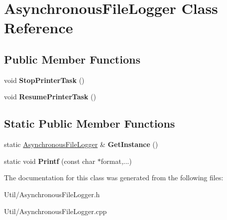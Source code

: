 \hypertarget{class_asynchronous_file_logger}{
\section{\-Asynchronous\-File\-Logger \-Class \-Reference}
\label{class_asynchronous_file_logger}
}
\subsection*{\-Public \-Member \-Functions}
\begin{DoxyCompactItemize}
\item 
\hypertarget{class_asynchronous_file_logger_a5702988e18a1192d3932f036c7f3932e}{
void {\bfseries \-Stop\-Printer\-Task} ()}
\label{class_asynchronous_file_logger_a5702988e18a1192d3932f036c7f3932e}

\item 
\hypertarget{class_asynchronous_file_logger_ac26af64b18b1987be954b7a9b8b79603}{
void {\bfseries \-Resume\-Printer\-Task} ()}
\label{class_asynchronous_file_logger_ac26af64b18b1987be954b7a9b8b79603}

\end{DoxyCompactItemize}
\subsection*{\-Static \-Public \-Member \-Functions}
\begin{DoxyCompactItemize}
\item 
\hypertarget{class_asynchronous_file_logger_a46c19d5711f635ce069bba0e54d189f0}{
static \hyperlink{class_asynchronous_file_logger}{\-Asynchronous\-File\-Logger} \& {\bfseries \-Get\-Instance} ()}
\label{class_asynchronous_file_logger_a46c19d5711f635ce069bba0e54d189f0}

\item 
\hypertarget{class_asynchronous_file_logger_afa60008ff76fe2159b0be85f1a53509c}{
static void {\bfseries \-Printf} (const char $\ast$format,...)}
\label{class_asynchronous_file_logger_afa60008ff76fe2159b0be85f1a53509c}

\end{DoxyCompactItemize}


\-The documentation for this class was generated from the following files\-:\begin{DoxyCompactItemize}
\item 
\-Util/\-Asynchronous\-File\-Logger.\-h\item 
\-Util/\-Asynchronous\-File\-Logger.\-cpp\end{DoxyCompactItemize}
